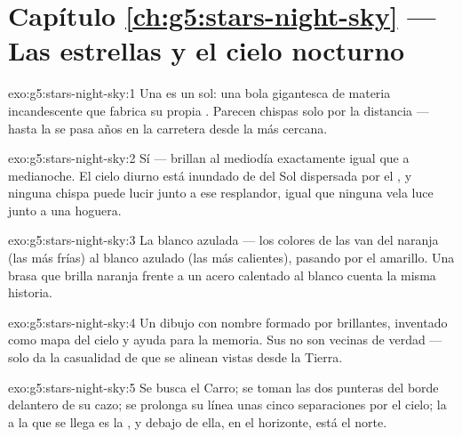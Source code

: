 \section*{Capítulo \ref{ch:g5:stars-night-sky} --- Las estrellas y el cielo nocturno}

\begin{solution}{exo:g5:stars-night-sky:1}
Una  es un sol: una bola gigantesca de materia
incandescente que fabrica su propia . Parecen chispas solo por
la distancia --- hasta la  se pasa años en la carretera desde la
más cercana.
\end{solution}

\begin{solution}{exo:g5:stars-night-sky:2}
Sí --- brillan al mediodía exactamente igual que a medianoche. El
cielo diurno está inundado de  del Sol dispersada por el , y
ninguna chispa puede lucir junto a ese resplandor, igual que ninguna
vela luce junto a una hoguera.
\end{solution}

\begin{solution}{exo:g5:stars-night-sky:3}
La blanco azulada --- los colores de las  van del naranja
(las más frías) al blanco azulado (las más calientes), pasando por el
amarillo. Una brasa que brilla naranja frente a un acero calentado al
blanco cuenta la misma historia.
\end{solution}

\begin{solution}{exo:g5:stars-night-sky:4}
Un dibujo con nombre formado por  brillantes, inventado como
mapa del cielo y ayuda para la memoria. Sus  no son vecinas
de verdad --- solo da la casualidad de que se alinean vistas desde la
Tierra.
\end{solution}

\begin{solution}{exo:g5:stars-night-sky:5}
Se busca el Carro; se toman las dos  punteras del borde
delantero de su cazo; se prolonga su línea unas cinco separaciones por
el cielo; la  a la que se llega es la
, y debajo de ella, en el horizonte, está el norte.
\end{solution}

